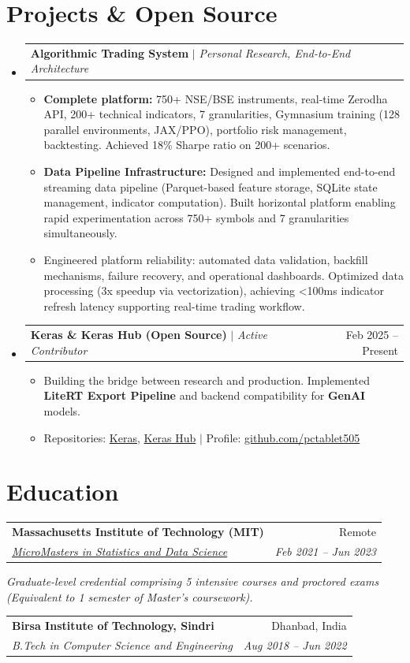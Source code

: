 \documentclass[10pt, letterpaper]{article}
\makeatletter
\newcommand{\resumeItem}[1]{
  \item\small{
    {#1 \vspace{-2pt}}
  }
}
\newcommand{\resumeSubheading}[4]{
  \vspace{-1pt}\item
    \begin{tabular*}{0.98\textwidth}[t]{l@{\extracolsep{\fill}}r}
      \textbf{#1} & {\small\color{darkgray} #2} \\
      \textit{\small#3} & \textit{\small\color{darkgray} #4} \\
    \end{tabular*}\vspace{-7pt}
}
\newcommand{\resumeProjectHeading}[2]{
    \item
    \begin{tabular*}{0.98\textwidth}{l@{\extracolsep{\fill}}r}
      \small#1 & #2 \\
    \end{tabular*}\vspace{-7pt}
}
\newcommand{\resumeSubHeadingListStart}{\begin{itemize}[leftmargin=0.15in, label={}]}
\newcommand{\resumeSubHeadingListEnd}{\end{itemize}}
\newcommand{\resumeItemListStart}{\begin{itemize}}
\newcommand{\resumeItemListEnd}{\end{itemize}\vspace{-5pt}}
\makeatother
\begin{document}
\section{Projects \& Open Source}
  \resumeSubHeadingListStart
    \resumeProjectHeading
      {\textbf{Algorithmic Trading System} $|$ \emph{Personal Research, End-to-End Architecture}}{}
      \resumeItemListStart
        \resumeItem{\textbf{Complete platform:} 750+ NSE/BSE instruments, real-time Zerodha API, 200+ technical indicators, 7 granularities, Gymnasium training (128 parallel environments, JAX/PPO), portfolio risk management, backtesting. Achieved 18\% Sharpe ratio on 200+ scenarios.}
        \resumeItem{\textbf{Data Pipeline Infrastructure:} Designed and implemented end-to-end streaming data pipeline (Parquet-based feature storage, SQLite state management, indicator computation). Built horizontal platform enabling rapid experimentation across 750+ symbols and 7 granularities simultaneously.}
        \resumeItem{Engineered platform reliability: automated data validation, backfill mechanisms, failure recovery, and operational dashboards. Optimized data processing (3x speedup via vectorization), achieving <100ms indicator refresh latency supporting real-time trading workflow.}
      \resumeItemListEnd

    \resumeProjectHeading
      {\textbf{Keras \& Keras Hub (Open Source)} $|$ \emph{Active Contributor}}{Feb 2025 -- Present}
      \resumeItemListStart
        \resumeItem{Building the bridge between research and production. Implemented \textbf{LiteRT Export Pipeline} and backend compatibility for \textbf{GenAI} models.}
        \resumeItem{Repositories: \href{https://github.com/keras-team/keras}{Keras}, \href{https://github.com/keras-team/keras-hub}{Keras Hub} $|$ Profile: \href{https://github.com/pctablet505}{\color{midnightblue}github.com/pctablet505}}
      \resumeItemListEnd
      
  \resumeSubHeadingListEnd

\section{Education}
  \resumeSubHeadingListStart
    \resumeSubheading
      {Massachusetts Institute of Technology (MIT)}{Remote}
      {\href{https://micromasters.mit.edu/ds}{MicroMasters in Statistics and Data Science}}{Feb 2021 -- Jun 2023}
      \vspace{-4pt}
      \small{\item{\textit{Graduate-level credential comprising 5 intensive courses and proctored exams (Equivalent to 1 semester of Master's coursework).}}}
    \resumeSubheading
      {Birsa Institute of Technology, Sindri}{Dhanbad, India}
      {B.Tech in Computer Science and Engineering}{Aug 2018 -- Jun 2022}
  \resumeSubHeadingListEnd
\end{document}
